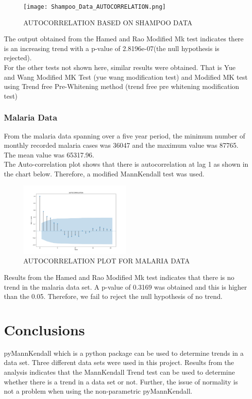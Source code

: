 \documentclass[12pt, letterpaper, twoside]{article}
\begin{document}
\begin{figure}
    \centering
    \texttt{[image: Shampoo\_Data\_AUTOCORRELATION.png]}
    \caption{AUTOCORRELATION BASED ON SHAMPOO DATA}
    \label{fig:my_label}
\end{figure}

The output obtained from the Hamed and Rao Modified Mk test indicates there is an increasing trend with a p-value of 2.8196e-07(the null hypothesis is rejected).\\ For the other tests not shown here, similar results were obtained. That is Yue and Wang Modified MK Test (yue wang modification test) and Modified MK test using Trend free Pre-Whitening method (trend free pre whitening modification test)\\

\subsubsection{Malaria Data}
From the malaria data spanning over a five year period, the minimum number of monthly recorded malaria cases was 36047 and the maximum value was 87765. The mean value was 65317.96. \\ The Auto-correlation plot shows that there is autocorrelation at lag 1 as shown in the chart below. Therefore, a modified MannKendall test was used.\\

\begin{figure}
    \centering
    \includegraphics[width=0.5\textwidth]{MALARIA_DATA_ACF_PLOT.png}
    \caption{AUTOCORRELATION PLOT FOR MALARIA DATA}
    \label{fig:my_label}
\end{figure}

Results from the Hamed and Rao Modified Mk test indicates that there is no trend in the malaria data set. A p-value of 0.3169 was obtained and this is higher than the 0.05. Therefore, we fail to reject the null hypothesis of no trend. 
\section{Conclusions}
pyMannKendall which is a python package can be used to determine trends in a data set. Three different data sets were used in this project. Results from the analysis indicates that the MannKendall Trend test can be used to determine whether there is a trend in a data set or not. Further, the issue of normality is not a problem when using the non-parametric pyMannKendall. 
\end{document}

